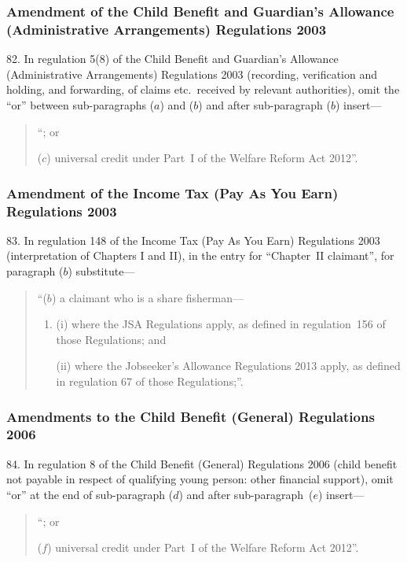\documentclass[12pt,a4paper]{article}
\begin{document}
\subsubsection[82. Amendment of the Child Benefit and Guardian’s Allowance (Administrative Arrangements) Regulations 2003]{Amendment of the Child Benefit and Guardian’s Allowance (Administrative Arrangements) Regulations 2003}

82.  In regulation 5(8) of the Child Benefit and Guardian’s Allowance (Administrative Arrangements) Regulations 2003 (recording, verification and holding, and forwarding, of claims etc.\ received by relevant authorities), omit the “or” between sub-paragraphs ($a$)  and ($b$)  and after sub-paragraph ($b$)  insert—
\begin{quotation}
“; or

($c$) universal credit under Part~I of the Welfare Reform Act 2012”.
\end{quotation}

\subsubsection[83. Amendment of the Income Tax (Pay As You Earn) Regulations 2003]{Amendment of the Income Tax (Pay As You Earn) Regulations 2003}

83.  In regulation 148 of the Income Tax (Pay As You Earn) Regulations 2003 (interpretation of Chapters I and II), in the entry for “Chapter~II claimant”, for paragraph ($b$)  substitute—
\begin{quotation}
“($b$) a claimant who is a share fisherman—
\begin{enumerate}\item[]
(i) where the JSA Regulations apply, as defined in regulation~156 of those Regulations; and

(ii) where the Jobseeker’s Allowance Regulations 2013 apply, as defined in regulation 67 of those Regulations;”.
\end{enumerate}
\end{quotation}

\subsubsection[84. Amendments to the Child Benefit (General) Regulations 2006]{Amendments to the Child Benefit (General) Regulations 2006}

84.  In regulation 8 of the Child Benefit (General) Regulations 2006 (child benefit not payable in respect of qualifying young person: other financial support), omit “or” at the end of sub-paragraph ($d$)  and after sub-paragraph~($e$)  insert—
\begin{quotation}
“; or

($f$) universal credit under Part~I of the Welfare Reform Act 2012”.
\end{quotation}
\end{document}
